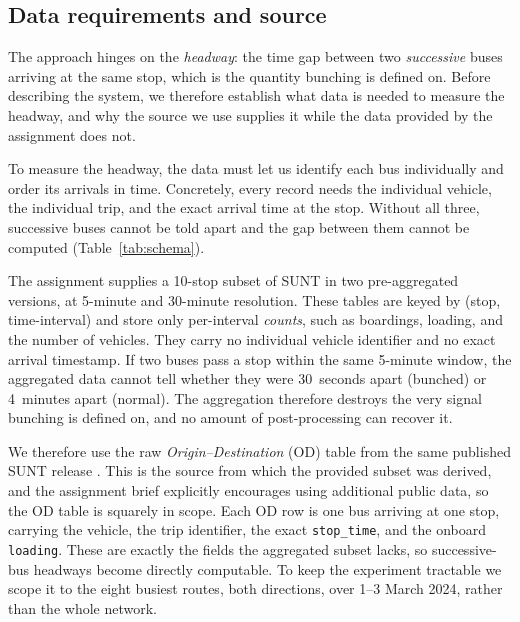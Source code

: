 \documentclass[11pt,a4paper]{article}
\begin{document}
\subsection{Data requirements and source}
\label{sec:data}

The approach hinges on the \emph{headway}: the time gap between two \emph{successive} buses arriving
at the same stop, which is the quantity bunching is defined on. Before describing the system, we
therefore establish what data is needed to measure the headway, and why the source we use supplies it
while the data provided by the assignment does not.

To measure the headway, the data must let us identify each bus individually and order its
arrivals in time. Concretely, every record needs the individual vehicle, the individual trip, and
the exact arrival time at the stop. Without all three, successive buses cannot be told apart and
the gap between them cannot be computed (Table~\ref{tab:schema}).

The assignment supplies a 10-stop subset of SUNT in two pre-aggregated versions, at 5-minute and
30-minute resolution. These tables are keyed by (stop, time-interval) and store only per-interval
\emph{counts}, such as boardings, loading, and the number of vehicles. They carry no individual
vehicle identifier and no exact arrival timestamp. If two buses pass a stop within the same
5-minute window, the aggregated data cannot tell whether they were 30~seconds apart (bunched) or
4~minutes apart (normal). The aggregation therefore destroys the very signal bunching is defined
on, and no amount of post-processing can recover it.

We therefore use the raw \emph{Origin--Destination} (OD) table from the same published SUNT release
\citep{Ferreira2025}. This is the source from which the provided subset was derived, and the
assignment brief explicitly encourages using additional public data, so the OD table is squarely in
scope. Each OD row is one bus arriving at one stop, carrying the vehicle, the trip identifier, the
exact \texttt{stop\_time}, and the onboard \texttt{loading}. These are exactly the fields the
aggregated subset lacks, so successive-bus headways become directly computable. To keep the
experiment tractable we scope it to the eight busiest routes, both directions, over 1--3 March 2024,
rather than the whole network.
\end{document}
